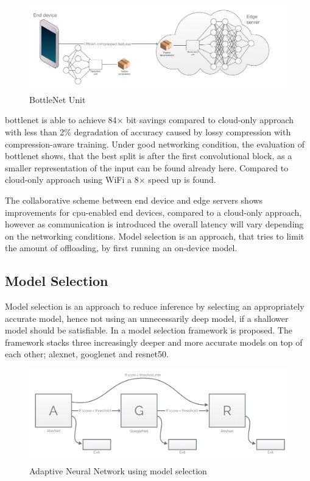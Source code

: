 \begin{figure}
	\centering
	\includegraphics[width=\linewidth]{figures/models/bottlenet}
	\caption[BottleNet Unit]{BottleNet Unit}
\end{figure}

\gls{bottlenet} is able to achieve 84$\times$ bit savings compared to cloud-only approach with less than 2\% degradation of accuracy caused by lossy compression with compression-aware training. Under good networking condition, the evaluation of \gls{bottlenet} shows, that the best split is after the first convolutional block, as a smaller representation of the input can be found already here. Compared to cloud-only approach using WiFi a 8$\times$ speed up is found.

The collaborative scheme between end device and edge servers shows improvements for \gls{cpu}-enabled end devices, compared to a cloud-only approach, however as communication is introduced the overall latency will vary depending on the networking conditions. Model selection is an approach, that tries to limit the amount of offloading, by first running an on-device model. 

\subsection{Model Selection}

Model selection is an approach to reduce inference by selecting an appropriately accurate model, hence not using an unnecessarily deep model, if a shallower model should be satisfiable. In \cite{bolukbasi_adaptive_2017} a model selection framework is proposed. The framework stacks three increasingly deeper and more accurate models on top of each other; \gls{alexnet}, \gls{googlenet} and \gls{resnet}50. 

\begin{figure}
	\centering
	\includegraphics[width=\linewidth]{figures/models/adaptive}
	\caption[Adaptive Neural Network]{Adaptive Neural Network using model selection}
\end{figure}

